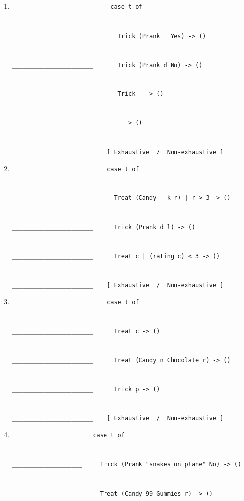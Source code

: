 \documentclass[paper=letter, fontsize=13pt]{article} %
\numberwithin{equation}{section} %
\begin{document}
\begin{enumerate}
\begin{enumerate}
\item 
\begin{lstlisting}
                            case t of


_______________________       Trick (Prank _ Yes) -> ()


_______________________       Trick (Prank d No) -> ()


_______________________       Trick _ -> ()


_______________________       _ -> ()


_______________________    [ Exhaustive  /  Non-exhaustive ]
\end{lstlisting}
\newpage

\item
\begin{lstlisting}
                           case t of


_______________________      Treat (Candy _ k r) | r > 3 -> ()


_______________________      Trick (Prank d l) -> ()


_______________________      Treat c | (rating c) < 3 -> ()


_______________________    [ Exhaustive  /  Non-exhaustive ]
\end{lstlisting}
\bigskip
\bigskip
\bigskip

\item
\begin{lstlisting}
                           case t of
                           
                           
_______________________      Treat c -> ()
                           
                           
_______________________      Treat (Candy n Chocolate r) -> ()  
                           
                           
_______________________      Trick p -> ()


_______________________    [ Exhaustive  /  Non-exhaustive ]
\end{lstlisting}
           \bigskip
           \bigskip
           \bigskip
           \bigskip

\item
\begin{lstlisting}
                       case t of


____________________     Trick (Prank "snakes on plane" No) -> ()


____________________     Treat (Candy 99 Gummies r) -> ()



\end{lstlisting}
\end{enumerate}
\end{enumerate}
\end{document}
